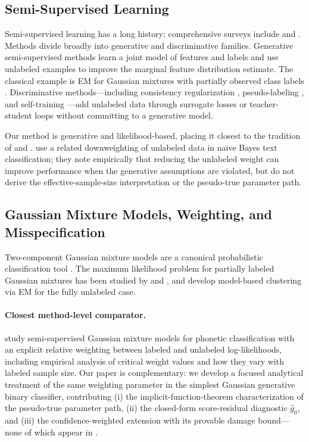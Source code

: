 \documentclass[11pt]{article}
\theoremstyle{definition}
\begin{document}
\subsection{Semi-Supervised Learning}

Semi-supervised learning has a long history; comprehensive surveys include
\citet{zhu2005semi} and \citet{chapelle2006semi}.
Methods divide broadly into generative and discriminative families.
Generative semi-supervised methods learn a joint model of features and
labels and use unlabeled examples to improve the marginal feature distribution estimate.
The classical example is EM for Gaussian mixtures with partially
observed class labels \citep{dempster1977maximum, ghahramani1994supervised}.
Discriminative methods---including consistency regularization
\citep{laine2016temporal, miyato2018virtual}, pseudo-labeling
\citep{lee2013pseudo}, and self-training \citep{scudder1965probability}---add
unlabeled data through surrogate losses or teacher-student loops
without committing to a generative model.

Our method is generative and likelihood-based, placing it closest to the
tradition of \citet{ghahramani1994supervised} and \citet{nigam2000text}.
\citet{nigam2000text} use a related downweighting of unlabeled data in
naive Bayes text classification; they note empirically that reducing the
unlabeled weight can improve performance when the generative assumptions
are violated, but do not derive the effective-sample-size interpretation
or the pseudo-true parameter path.

\subsection{Gaussian Mixture Models, Weighting, and Misspecification}

Two-component Gaussian mixture models are a canonical probabilistic
classification tool \citep{fraley2002model, mcnicholas2016mixture}.
The maximum likelihood problem for partially labeled Gaussian mixtures
has been studied by \citet{ganesalingam1978classification} and
\citet{o1978normal}, and \citet{banfield1993model} develop model-based
clustering via EM for the fully unlabeled case.

\paragraph{Closest method-level comparator.}
\citet{huang2009semi} study semi-supervised Gaussian mixture models
for phonetic classification with an explicit relative weighting between
labeled and unlabeled log-likelihoods, including empirical analysis of
critical weight values and how they vary with labeled sample size.
Our paper is complementary: we develop a focused analytical treatment
of the same weighting parameter in the simplest Gaussian generative
binary classifier, contributing (i) the implicit-function-theorem
characterization of the pseudo-true parameter path, (ii) the closed-form
score-residual diagnostic \(\hat g_0\), and (iii) the confidence-weighted
extension with its provable damage bound---none of which appear in
\citet{huang2009semi}.
\end{document}
